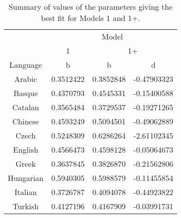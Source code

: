 \documentclass{article}
\begin{document}
\begin{table}[H]
\centering
\begin{tabular}{c|c|cc|}
    \cline{2-4}
    & \multicolumn{3}{c|}{Model} \\
    \cline{2-4}
    & 1 & \multicolumn{2}{c|}{1+} \\
    \hline
    \multicolumn{1}{|c|}{Language}  & b & b & d\\
    \hline
    \multicolumn{1}{|c|}{Arabic}    & 0.3512422     & 0.3852848       & -0.47903323\\
    \multicolumn{1}{|c|}{Basque}    & 0.4370793     & 0.4545331       & -0.15400588\\
    \multicolumn{1}{|c|}{Catalan}   & 0.3565484     & 0.3729537       & -0.19271265\\
    \multicolumn{1}{|c|}{Chinese}   & 0.4593249     & 0.5094501       & -0.49062889\\
    \multicolumn{1}{|c|}{Czech}     & 0.5248309     & 0.6286264       & -2.61102345\\
    \multicolumn{1}{|c|}{English}   & 0.4566473     & 0.4598128       & -0.05064673\\
    \multicolumn{1}{|c|}{Greek}     & 0.3637845     & 0.3826870       & -0.21562806\\
    \multicolumn{1}{|c|}{Hungarian} & 0.5940305     & 0.5988579       & -0.11455854\\
    \multicolumn{1}{|c|}{Italian}   & 0.3726787     & 0.4094078       & -0.44923822\\
    \multicolumn{1}{|c|}{Turkish}   & 0.4127196     & 0.4167909       & -0.03991731\\
    \hline
\end{tabular}
\label{Table:T5}
\caption{Summary of values of the parameters giving the best fit for Models 1 and 1+.}
\end{table}
\end{document}
